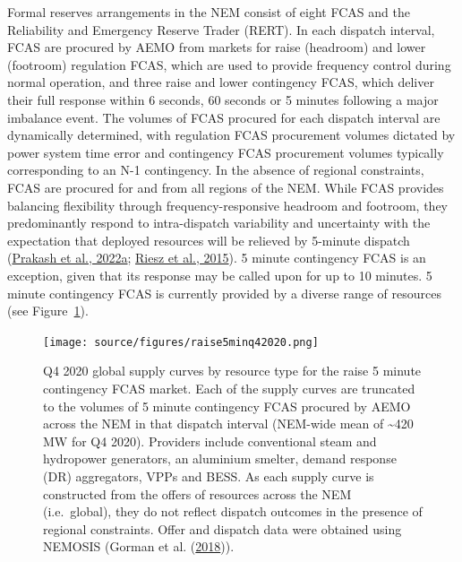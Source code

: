 \documentclass[12pt,a4paper,]{report}
\begin{document}
Formal reserves arrangements in the NEM consist of eight FCAS and the
Reliability and Emergency Reserve Trader (RERT). In each dispatch
interval, FCAS are procured by AEMO from markets for raise (headroom)
and lower (footroom) regulation FCAS, which are used to provide
frequency control during normal operation, and three raise and lower
contingency FCAS, which deliver their full response within 6 seconds, 60
seconds or 5 minutes following a major imbalance event. The volumes of
FCAS procured for each dispatch interval are dynamically determined,
with regulation FCAS procurement volumes dictated by power system time
error and contingency FCAS procurement volumes typically corresponding
to an N-1 contingency. In the absence of regional constraints, FCAS are
procured for and from all regions of the NEM. While FCAS provides
balancing flexibility through frequency-responsive headroom and
footroom, they predominantly respond to intra-dispatch variability and
uncertainty with the expectation that deployed resources will be
relieved by 5-minute dispatch
(\protect\hyperlink{ref-prakashInsightsDesigningEffective2022}{Prakash
et al., 2022a};
\protect\hyperlink{ref-rieszFrequencyControlAncillary2015}{Riesz et al.,
2015}). 5 minute contingency FCAS is an exception, given that its
response may be called upon for up to 10 minutes. 5 minute contingency
FCAS is currently provided by a diverse range of resources (see
Figure~\ref{fig:raise_delayed_supply}).

\begin{figure}
\hypertarget{fig:raise_delayed_supply}{%
\centering
\texttt{[image: source/figures/raise5minq42020.png]}
\caption[Q4 2020 5-minute contingency FCAS global supply curve by
resource type]{Q4 2020 global supply curves by resource type for the
raise 5 minute contingency FCAS market. Each of the supply curves are
truncated to the volumes of 5 minute contingency FCAS procured by AEMO
across the NEM in that dispatch interval (NEM-wide mean of
\textasciitilde420 MW for Q4 2020). Providers include conventional steam
and hydropower generators, an aluminium smelter, demand response (DR)
aggregators, VPPs and BESS. As each supply curve is constructed from the
offers of resources across the NEM (i.e.~global), they do not reflect
dispatch outcomes in the presence of regional constraints. Offer and
dispatch data were obtained using NEMOSIS (Gorman et al.
(\protect\hyperlink{ref-gormanNEMOSISNEMOpen2018}{2018})).}\label{fig:raise_delayed_supply}
}
\end{figure}
\end{document}
